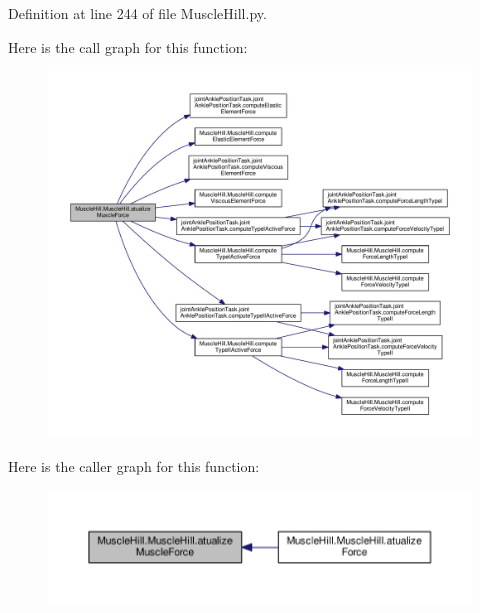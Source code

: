 Definition at line 244 of file Muscle\+Hill.\+py.



Here is the call graph for this function\+:
\nopagebreak
\begin{figure}[H]
\begin{center}
\leavevmode
\includegraphics[width=350pt]{class_muscle_hill_1_1_muscle_hill_ab39eb3b82b6299bbfbccb6d50f1da8b5_cgraph}
\end{center}
\end{figure}




Here is the caller graph for this function\+:
\nopagebreak
\begin{figure}[H]
\begin{center}
\leavevmode
\includegraphics[width=350pt]{class_muscle_hill_1_1_muscle_hill_ab39eb3b82b6299bbfbccb6d50f1da8b5_icgraph}
\end{center}
\end{figure}


